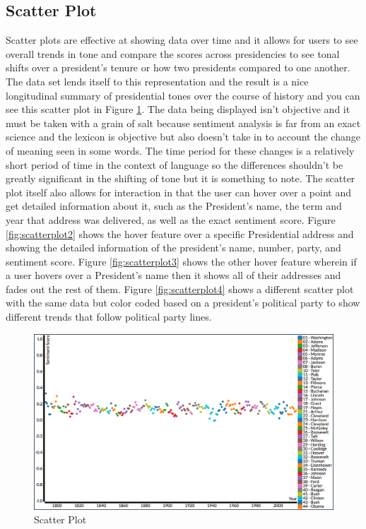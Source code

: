\subsection{Scatter Plot}
Scatter plots are effective at showing data over time and it allows for users to see overall trends in tone and compare the scores across presidencies to see tonal shifts over a president's tenure or how two presidents compared to one another.
The data set lends itself to this representation and the result is a nice longitudinal summary of presidential tones over the course of history and you can see this scatter plot in Figure \ref{fig:scatterplot1}.
The data being displayed isn't objective and it must be taken with a grain of salt because sentiment analysis is far from an exact science and the lexicon is objective but also doesn't take in to account the change of meaning seen in some words.
The time period for these changes is a relatively short period of time in the context of language so the differences shouldn't be greatly significant in the shifting of tone but it is something to note.
The scatter plot itself also allows for interaction in that the user can hover over a point and get detailed information about it, such as the President's name, the term and year that address was delivered, as well as the exact sentiment score.
Figure \ref{fig:scatterplot2} shows the hover feature over a specific Presidential address and showing the detailed information of the president's name, number, party, and sentiment score.
Figure \ref{fig:scatterplot3} shows the other hover feature wherein if a user hovers over a President's name then it shows all of their addresses and fades out the rest of them.
Figure \ref{fig:scatterplot4} shows a different scatter plot with the same data but color coded based on a president's political party to show different trends that follow political party lines.

\begin{figure}
  \includegraphics[width=\columnwidth]{images/scatter_plot.png}
  \caption{Scatter Plot}
  \label{fig:scatterplot1}
\end{figure}

